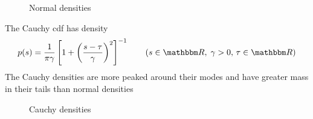 \begin{frame}

    \begin{figure}
   \begin{center}
    \caption{\label{f:normal_densities} Normal densities}
   \end{center}
    \end{figure}
    
\end{frame}

\begin{frame}

    \vspace{2em}
    \Eg
    The Cauchy {\sc cdf} has density
    \begin{equation*}
        p(s) = 
        \frac{1}{\pi \gamma}
            \left[
                1 + \left( \frac{s - \tau}{\gamma} \right)^2
            \right]^{-1}
            \qquad (s \in \RR, \; \gamma > 0, \, \tau \in \RR)
    \end{equation*}
    The Cauchy densities are more peaked around their modes and have greater
    mass in their tails than normal densities
    
\end{frame}

\begin{frame}

    \begin{figure}
   \begin{center}
    \caption{\label{f:cauchy_densities} Cauchy densities}
   \end{center}
    \end{figure}
    
\end{frame}

